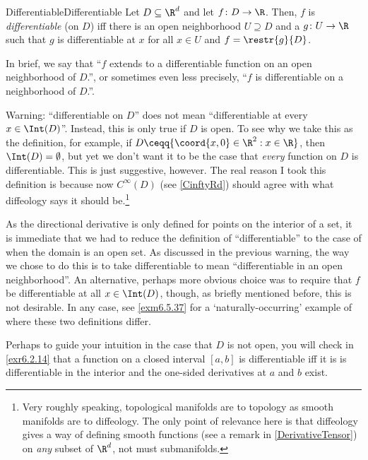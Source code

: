 \begin{dfn}{Differentiable}{Differentiable}
Let $D\subseteq \R ^d$ and let $f\colon D\rightarrow \R$.  Then, $f$ is \emph{differentiable} (on $D$) iff there is an open neighborhood $U\supseteq D$ and a $g\colon U\rightarrow \R$ such that $g$ is differentiable at $x$ for all $x\in U$ and $f=\restr{g}{D}$.
\begin{rmk}
In brief, we say that ``$f$ extends to a differentiable function on an open neighborhood of $D$.'', or sometimes even less precisely, ``$f$ is differentiable on a neighborhood of $D$.''.
\end{rmk}
\begin{wrn}
Warning:  ``differentiable on $D$'' does not mean ``differentiable at every $x\in \Int (D)$''.  Instead, this is only true if $D$ is open.  To see why we take this as the definition, for example, if $D\ceqq \{ \coord{x,0}\in \R ^2:x\in \R\}$, then $\Int (D)=\emptyset$, but yet we don't want it to be the case that \emph{every} function on $D$ is differentiable.  This is just suggestive, however.  The real reason I took this definition is because now $C^{\infty}(D)$ (see \cref{CinftyRd}) should agree with what diffeology says it should be.\footnote{Very roughly speaking, topological manifolds are to topology as smooth manifolds are to diffeology.  The only point of relevance here is that diffeology gives a way of defining smooth functions (see a remark in \cref{DerivativeTensor}) on \emph{any} subset of $\R ^d$, not must submanifolds.}
\end{wrn}
\begin{rmk}
As the directional derivative is only defined for points on the interior of a set, it is immediate that we had to reduce the definition of ``differentiable'' to the case of when the domain is an open set.  As discussed in the previous warning, the way we chose to do this is to take differentiable to mean ``differentiable in an open neighborhood''.  An alternative, perhaps more obvious choice was to require that $f$ be differentiable at all $x\in \Int (D)$, though, as briefly mentioned before, this is not desirable.  In any case, see \cref{exm6.5.37} for a `naturally-occurring' example of where these two definitions differ.
\end{rmk}
\begin{rmk}
Perhaps to guide your intuition in the case that $D$ is not open, you will check in \cref{exr6.2.14} that a function on a closed interval $[a,b]$ is differentiable iff it is is differentiable in the interior and the one-sided derivatives at $a$ and $b$ exist.
\end{rmk}
\end{dfn}
